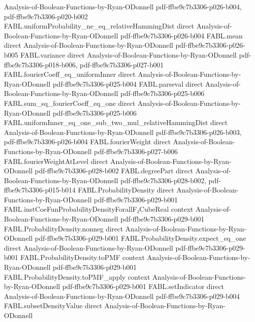 \begin{theorem}
  {Analysis-of-Boolean-Functions-by-Ryan-ODonnell}
  {pdf-ffbe9c7b3306-p026-b004,
    pdf-ffbe9c7b3306-p020-b002}
\proofstep
  {FABL.uniformProbability_ne_eq_relativeHammingDist}
  {direct}
  {Analysis-of-Boolean-Functions-by-Ryan-ODonnell}
  {pdf-ffbe9c7b3306-p026-b004}
\proofstep
  {FABL.mean}
  {direct}
  {Analysis-of-Boolean-Functions-by-Ryan-ODonnell}
  {pdf-ffbe9c7b3306-p026-b005}
\proofstep
  {FABL.variance}
  {direct}
  {Analysis-of-Boolean-Functions-by-Ryan-ODonnell}
  {pdf-ffbe9c7b3306-p018-b006,
    pdf-ffbe9c7b3306-p027-b001}
\proofstep
  {FABL.fourierCoeff_eq_uniformInner}
  {direct}
  {Analysis-of-Boolean-Functions-by-Ryan-ODonnell}
  {pdf-ffbe9c7b3306-p025-b004}
\proofstep
  {FABL.parseval}
  {direct}
  {Analysis-of-Boolean-Functions-by-Ryan-ODonnell}
  {pdf-ffbe9c7b3306-p025-b006}
\proofstep
  {FABL.sum_sq_fourierCoeff_eq_one}
  {direct}
  {Analysis-of-Boolean-Functions-by-Ryan-ODonnell}
  {pdf-ffbe9c7b3306-p025-b006}
\proofstep
  {FABL.uniformInner_eq_one_sub_two_mul_relativeHammingDist}
  {direct}
  {Analysis-of-Boolean-Functions-by-Ryan-ODonnell}
  {pdf-ffbe9c7b3306-p026-b003,
    pdf-ffbe9c7b3306-p026-b004}
\proofstep
  {FABL.fourierWeight}
  {direct}
  {Analysis-of-Boolean-Functions-by-Ryan-ODonnell}
  {pdf-ffbe9c7b3306-p027-b006}
\proofstep
  {FABL.fourierWeightAtLevel}
  {direct}
  {Analysis-of-Boolean-Functions-by-Ryan-ODonnell}
  {pdf-ffbe9c7b3306-p028-b002}
\proofstep
  {FABL.degreePart}
  {direct}
  {Analysis-of-Boolean-Functions-by-Ryan-ODonnell}
  {pdf-ffbe9c7b3306-p028-b002,
    pdf-ffbe9c7b3306-p015-b014}
\proofstep
  {FABL.ProbabilityDensity}
  {direct}
  {Analysis-of-Boolean-Functions-by-Ryan-ODonnell}
  {pdf-ffbe9c7b3306-p029-b001}
\proofstep
  {FABL.instCoeFunProbabilityDensityForallF₂CubeReal}
  {context}
  {Analysis-of-Boolean-Functions-by-Ryan-ODonnell}
  {pdf-ffbe9c7b3306-p029-b001}
\proofstep
  {FABL.ProbabilityDensity.nonneg}
  {direct}
  {Analysis-of-Boolean-Functions-by-Ryan-ODonnell}
  {pdf-ffbe9c7b3306-p029-b001}
\proofstep
  {FABL.ProbabilityDensity.expect_eq_one}
  {direct}
  {Analysis-of-Boolean-Functions-by-Ryan-ODonnell}
  {pdf-ffbe9c7b3306-p029-b001}
\proofstep
  {FABL.ProbabilityDensity.toPMF}
  {context}
  {Analysis-of-Boolean-Functions-by-Ryan-ODonnell}
  {pdf-ffbe9c7b3306-p029-b001}
\proofstep
  {FABL.ProbabilityDensity.toPMF_apply}
  {context}
  {Analysis-of-Boolean-Functions-by-Ryan-ODonnell}
  {pdf-ffbe9c7b3306-p029-b001}
\proofstep
  {FABL.setIndicator}
  {direct}
  {Analysis-of-Boolean-Functions-by-Ryan-ODonnell}
  {pdf-ffbe9c7b3306-p029-b004}
\proofstep
  {FABL.subsetDensityValue}
  {direct}
  {Analysis-of-Boolean-Functions-by-Ryan-ODonnell}

\end{theorem}
